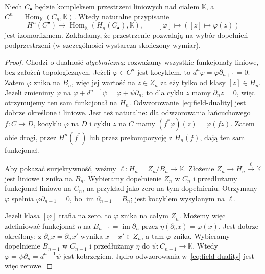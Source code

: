 \begin{twierdzenie}
\label{thm:field-hom-dual}
Niech $C_\bullet$ będzie kompleksem
przestrzeni liniowych nad ciałem
$\mathbb K$, a
$C^n=\operatorname{Hom}_{\mathbb K}(C_n,\mathbb K)$.
Wtedy naturalne przypisanie
\begin{equation}\label{eq:field-duality}
 H^n(C^\bullet)
 \longrightarrow\operatorname{Hom}_{\mathbb K}
  (H_n(C_\bullet),\mathbb K),
 \qquad [\varphi]\longmapsto
     ([z]\longmapsto\varphi(z))
\end{equation}
jest izomorfizmem. Zakładamy, że
przestrzenie pozwalają na wybór
dopełnień podprzestrzeni
(w szczególności wystarcza skończony wymiar).
\end{twierdzenie}
\begin{proof}
Chodzi o dualność \emph{algebraiczną}: rozważamy wszystkie
funkcjonały liniowe, bez założeń topologicznych.
Jeżeli $\varphi\in C^n$ jest kocyklem,
to $d^n\varphi=\varphi \partial_{n+1}=0$.
Zatem $\varphi$ znika na $B_n$,
więc jej wartość na $z\in Z_n$
zależy tylko od klasy $[z]\in H_n$.
Jeżeli zmienimy $\varphi$ na
$\varphi+d^{n-1}\psi
=\varphi+\psi \partial_n$, to dla cyklu $z$
mamy $\partial_nz=0$, więc otrzymujemy
ten sam funkcjonał na $H_n$.
Odwzorowanie~\eqref{eq:field-duality} jest
dobrze określone i liniowe. Jest też naturalne: dla odwzorowania
łańcuchowego $f:C\to D$, kocyklu $\varphi$ na $D$ i cyklu $z$ na $C$
mamy $(f^*\varphi)(z)=\varphi(fz)$. Zatem obie drogi, przez
$H^n(f^*)$ lub przez prekompozycję z $H_n(f)$, dają ten sam funkcjonał.

Aby pokazać surjektywność, weźmy
$\ell:H_n=Z_n/B_n\to\mathbb K$.
Złożenie $Z_n\to H_n\xrightarrow{\ell}\mathbb K$
jest liniowe i znika na $B_n$.
Wybieramy dopełnienie $Z_n$ w $C_n$
i przedłużamy funkcjonał liniowo
na $C_n$, na przykład jako zero
na tym dopełnieniu. Otrzymany
$\varphi$ spełnia
$\varphi \partial_{n+1}=0$, bo
$\operatorname{im}\partial_{n+1}=B_n$;
jest kocyklem wysyłanym na $\ell$.

Jeżeli klasa $[\varphi]$ trafia na zero,
to $\varphi$ znika na całym $Z_n$.
Możemy więc zdefiniować funkcjonał
$\eta$ na $B_{n-1}=\operatorname{im}\partial_n$
przez $\eta(\partial_nx)=\varphi(x)$.
Jest dobrze określony: z
$\partial_nx=\partial_nx'$ wynika $x-x'\in Z_n$,
a tam $\varphi$ znika.
Wybieramy dopełnienie $B_{n-1}$
w $C_{n-1}$ i przedłużamy $\eta$
do $\psi:C_{n-1}\to\mathbb K$.
Wtedy $\varphi=\psi \partial_n=d^{n-1}\psi$
jest kobrzegiem. Jądro odwzorowania
w~\eqref{eq:field-duality} jest więc zerowe.
\end{proof}

